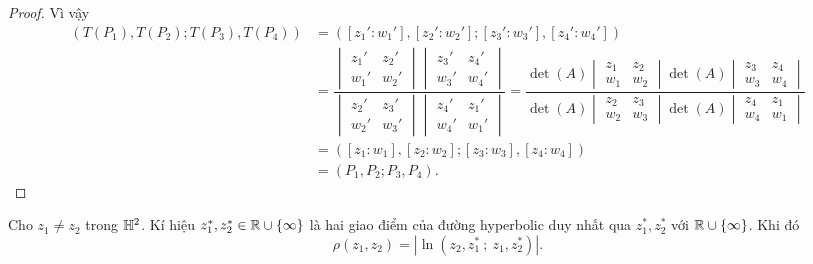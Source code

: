 \begin{proof}
    Vì vậy 
    \begin{align*}
        (T(P_1),T(P_2);T(P_3),T(P_4)) &= ([z_1':w_1'],[z_2':w_2'];[z_3':w_3'],[z_4':w_4'])\\
        &= \dfrac{\begin{vmatrix}
         z_1' & z_2'\\
         w_1' & w_2'
    \end{vmatrix}\begin{vmatrix}
         z_3' & z_4'\\
         w_3' & w_4'
    \end{vmatrix}}{\begin{vmatrix}
         z_2' & z_3'\\
         w_2' & w_3'
    \end{vmatrix}\begin{vmatrix}
         z_4' & z_1'\\
         w_4' & w_1'
    \end{vmatrix}}
    = \dfrac{\det(A)\begin{vmatrix}
         z_1 & z_2\\
         w_1 & w_2
    \end{vmatrix}\det(A)\begin{vmatrix}
         z_3 & z_4\\
         w_3 & w_4
    \end{vmatrix}}{\det(A)\begin{vmatrix}
         z_2 & z_3\\
         w_2 & w_3
    \end{vmatrix}\det(A)\begin{vmatrix}
         z_4 & z_1\\
         w_4 & w_1
    \end{vmatrix}}\\
    &= ([z_1:w_1],[z_2:w_2];[z_3:w_3],[z_4:w_4])\\
    &=(P_1,P_2;P_3,P_4).
    \end{align*}
\end{proof}
\begin{thm}\label{thm 2.2.16}
    Cho $z_1\neq z_2$ trong $\mathbb{H}^2$. Kí hiệu $z_1^*,z_2^* \in \mathbb{R} \cup \{\infty\}$ là hai giao điểm của đường hyperbolic duy nhất qua $z_1^*,z_2^*$ với $\mathbb{R} \cup \{\infty\}$. Khi đó
    \[\rho(z_1,z_2) = |\ln{(z_2,z_1^*~;~z_1,z_2^*)}|.\]
\end{thm}
